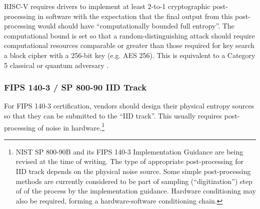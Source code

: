     RISC-V requires drivers to implement at least 2-to-1 cryptographic
    post-processing in software with the expectation that the final output
    from this post-processing would should have ``computationally bounded
    full entropy''.  The computational bound is set so that a
    random-distinguishing attack should require computational resources
    comparable or greater than those required for key search a block cipher
    with a 256-bit key (e.g. AES 256). This is equivalent to a Category 5
    classical or quantum adversary
    \cite[Section 4.A.4 Security Strength Categories]{NI16}.

    \subsubsection{FIPS 140-3 / SP 800-90 IID Track}

    For FIPS 140-3 certification, vendors should design their physical entropy
    sources so that they can be submitted to the  ``IID track''. This usually
    requires post-processing of noise in hardware.\footnote{NIST SP 800-90B
        \cite{TuBaKe+18} and its  FIPS 140-3 Implementation Guidance
        \cite[Section D.K.]{NICC20} are being revised at the time of writing.
        The type of appropriate post-processing for IID track depends on
        the physical noise source. Some simple post-processing methods are
        currently considered to be part of sampling (``digitization'') step of
        of the process by the implementation guidance. Hardware conditioning
        may also be required, forming a hardware-software conditioning chain.}


